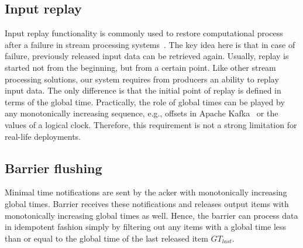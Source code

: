 

\subsection{Input replay}
Input replay functionality is commonly used to restore computational process after a failure in stream processing systems~\cite{Carbone:2017:SMA:3137765.3137777, Akidau:2013:MFS:2536222.2536229, apache:storm}. The key idea here is that in case of failure, previously released input data can be retrieved again. Usually, replay is started not from the beginning, but from a certain point. Like other stream processing solutions, our system requires from producers an ability to replay input data. The only difference is that the initial point of replay is defined in terms of the global time. Practically, the role of global times can be played by any monotonically increasing sequence, e.g., offsets in Apache Kafka~\cite{kreps2011kafka} or the values of a logical clock. Therefore, this requirement is not a strong limitation for real-life deployments.

\subsection{Barrier flushing}
Minimal time notifications are sent by the acker with monotonically increasing global times. Barrier receives these notifications and releases output items with monotonically increasing global times as well. Hence, the barrier can process data in idempotent fashion simply by filtering out any items with a global time less than or equal to the global time of the last released item $GT_{last}$. 

